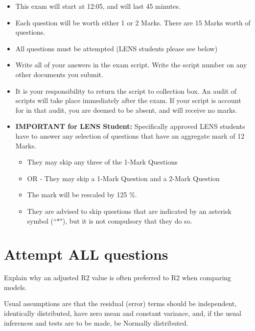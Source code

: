 \documentclass[a4paper,12pt]{article}
\begin{document}
\begin{itemize} 
	\item This exam will start at 12:05, and will last 45 minutes.
	
	\item Each question will be worth either 1 or 2 Marks. There are 15 Marks worth of questions.
	\item All questions must be attempted (LENS students please see below)
	
	\item Write all of your answers in the exam script. Write the script number on any other documents you submit.
	
	\item It is your responsibility to return the script to collection box. An audit of scripts will take place immediately after the exam. If your script is account for in that audit,  you are deemed to be absent, and will receive no marks.
	
	\item \textbf{IMPORTANT for LENS Student:}
	Specifically approved LENS students have to answer any selection of questions that have an aggregate mark of 12 Marks.  
	\begin{itemize}
		\item They may skip any three of the 1-Mark Questions
		\item OR - They may skip a 1-Mark Question and a 2-Mark Question
		\item The mark will be rescaled by 125 \%.
		\item They are advised to skip questions that are indicated by an asterisk symbol (``$\ast$"), but it is not compulsory that they do so.
	\end{itemize}
	
	
\end{itemize}
\newpage
\section*{Attempt ALL questions}


Explain why an adjusted R2 value is often preferred to R2
when comparing
models. 




Usual assumptions are that the residual (error) terms should be independent,
identically distributed, have zero mean and constant variance, and, if the usual
inferences and tests are to be made, be Normally distributed. 
\end{document}
